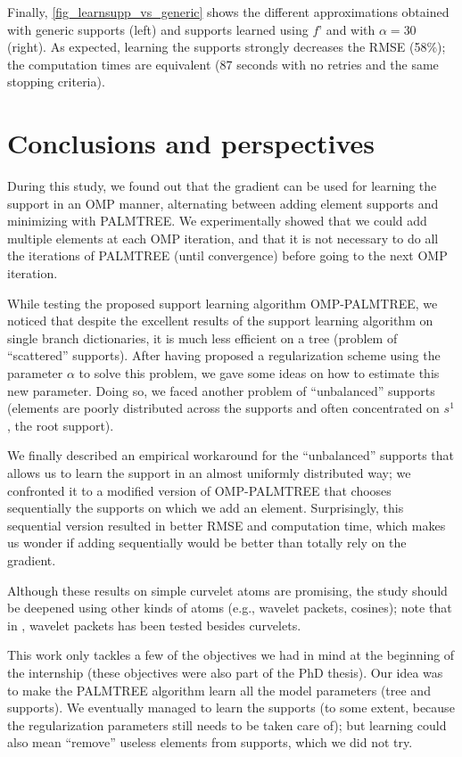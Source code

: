 Finally, \cref{fig_learnsupp_vs_generic} shows the different approximations obtained with generic supports (left) and supports learned using $f’$ and with $\alpha=30$ (right). As expected, learning the supports strongly decreases the RMSE (58\%); the computation times are equivalent (87 seconds with no retries and the same stopping criteria).


\FloatBarrier
\section{Conclusions and perspectives}

 
During this study, we found out that the gradient can be used for learning the support in an \ac{OMP} manner, alternating between adding element supports and minimizing with PALMTREE. We experimentally showed that we could add multiple elements at each OMP iteration, and that it is not necessary to do all the iterations of PALMTREE (until convergence) before going to the next OMP iteration. 

\noindent
While testing the proposed support learning algorithm OMP-PALMTREE, we noticed that despite the excellent results of the support learning algorithm on single branch dictionaries, it is much less efficient on a tree (problem of “scattered” supports). After having proposed a regularization scheme using the parameter $\alpha$ to solve this problem, we gave some ideas on how to estimate this new parameter. Doing so, we faced another problem of “unbalanced” supports (elements are poorly distributed across the supports and often concentrated on $s^1$, the root support). 

\noindent
We finally described an empirical workaround for the “unbalanced” supports that allows us to learn the support in an almost uniformly distributed way; we confronted it to a modified version of OMP-PALMTREE that chooses sequentially the supports on which we add an element. Surprisingly, this sequential version resulted in better RMSE and computation time, which makes us wonder if adding sequentially would be better than totally rely on the gradient.

\noindent
Although these results on simple curvelet atoms are promising, the study should be deepened using other kinds of atoms (e.g., wavelet packets, cosines); note that in \cite{chabiron_optimization_2016}, wavelet packets has been tested besides curvelets.

This work only tackles a few of the objectives we had in mind at the beginning of the internship (these objectives were also part of the PhD thesis). Our idea was to make the \ac{PALMTREE} algorithm learn all the model parameters (tree and supports). We eventually managed to learn the supports (to some extent, because the regularization parameters still needs to be taken care of); but learning could also mean “remove” useless elements from supports, which we did not try.
 
